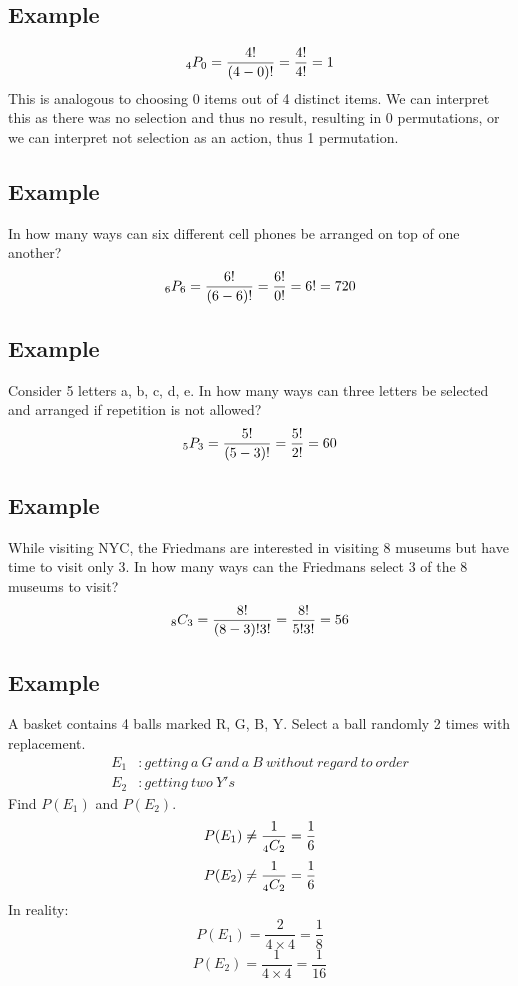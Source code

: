 \documentclass[letterpaper, 12pt]{math}
\begin{document}
\subsection*{Example}
\[ _{4}P_{0} = \frac{4!}{(4-0)!} = \frac{4!}{4!} = 1\]
This is analogous to choosing 0 items out of 4 distinct items. We can
interpret this as there was no selection and thus no result, resulting in 0
permutations, or we can interpret not selection as an action, thus 1
permutation.

\subsection*{Example}
In how many ways can six different cell phones be arranged on top of one
another?
\[ _{6}P_{6} = \frac{6!}{(6-6)!} = \frac{6!}{0!} = 6! = 720 \]

\subsection*{Example}
Consider 5 letters a, b, c, d, e. In how many ways can three letters be
selected and arranged if repetition is not allowed?
\[ _{5}P_{3} = \frac{5!}{(5-3)!} = \frac{5!}{2!} = 60 \]

\subsection*{Example}
While visiting NYC, the Friedmans are interested in visiting 8 museums but have
time to visit only 3. In how many ways can the Friedmans select 3 of the 8
museums to visit?
\[ _{8}C_{3} = \frac{8!}{(8-3)!3!} = \frac{8!}{5!3!} = 56 \]

\subsection*{Example}
A basket contains 4 balls marked R, G, B, Y. Select a ball randomly 2 times
with replacement.
\begin{align*}
  E_{1}&: getting\ a\ G\ and\ a\ B\ without\ regard\ to\ order \\
  E_{2}&: getting\ two\ Y's
\end{align*}
Find \( P(E_{1}) \) and \( P(E_{2}) \).
\[ P(E_{1}) \neq \frac{1}{_{4}C_{2}} = \frac{1}{6} \]
\[ P(E_{2}) \neq \frac{1}{_{4}C_{2}} = \frac{1}{6} \]
In reality:
\[ P(E_{1}) = \frac{2}{4\times4} = \frac{1}{8} \]
\[ P(E_{2}) = \frac{1}{4\times4} = \frac{1}{16} \]
\end{document}
